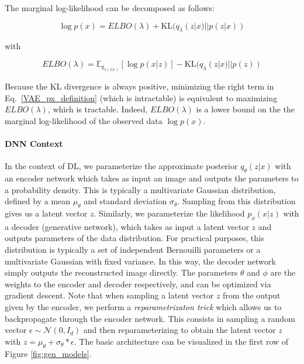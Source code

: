 


The marginal log-likelihood can be decomposed as follows:

\begin{equation}
      \label{VAE_px_definition}
      \log p(x) = ELBO(\lambda) + \mathrm{KL}(q_\lambda(z|x) || p(z|x))
\end{equation}

with 

\begin{equation}
      ELBO(\lambda) = \mathbb{E}_{q_{\lambda(z|x)}}[\log p(x|z)] - \mathrm{KL}(q_\lambda(z|x) || p(z))
\end{equation}

Because the \ac{KL} divergence is always positive,  minimizing the right term in 
Eq.~\ref{VAE_px_definition} (which is intractable) is equivalent to maximizing $ELBO(\lambda)$, which is tractable. 
Indeed, $ELBO(\lambda)$ is a lower bound on the the marginal log-likelihood of the observed data $\log p(x)$.

\paragraph{DNN Context}
In the context of \ac{DL}, we parameterize the approximate posterior $q_\theta(z|x)$ with an encoder network which 
takes as input an image and outputs the parameters to a probability density. This 
is typically a multivariate Gaussian distribution, defined by a mean $\mu_\theta$ and standard deviation $\sigma_\theta$. Sampling from this 
distribution gives us a latent vector $z$. Similarly, we parameterize the likelihood $p_\phi(x|z)$ with a decoder 
(generative network), which takes as input a latent vector $z$ and outputs parameters of the data distribution.
For practical purposes, this distribution is typically a set of independent Bernouilli parameters or a multivariate 
Gaussian with fixed variance. In this way, the decoder
network simply outputs the reconstructed image directly.
The parameters $\theta$ and $\phi$ are the weights to the 
encoder and decoder respectively, and can be optimized via gradient descent. Note that when sampling a 
latent vector $z$ from the output given by the encoder, we perform a \emph{reparametrizaton trick} which 
allows us to backpropagate through the encoder network. This consists in sampling a random vector 
$\epsilon \sim \mathcal{N}(0, I_d)$ and then reparameterizing to obtain the latent vector $z$ with 
$z = \mu_\theta +  \sigma_\theta * \epsilon $. The basic architecture can be visualized in the 
first row of Figure \ref{fig:gen_models}.

